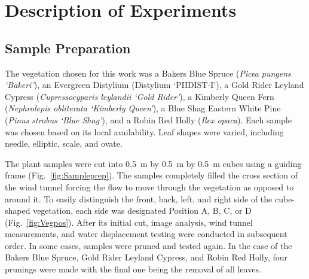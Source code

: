 \documentclass[12pt]{article}
\begin{document}
\section{Description of Experiments}
\label{sec:Experiments}


\subsection{Sample Preparation}
\label{ssec:SamplePrep}

The vegetation chosen for this work was a Bakers Blue Spruce ({\em Picea pungens `Bakeri'}), an Evergreen Distylium (Distylium `PIIDIST-I'), a Gold Rider Leyland Cypress ({\em Cupressocyparis leylandii `Gold Rider'}), a Kimberly Queen Fern ({\em Nephrolepis obliterata `Kimberly Queen'}), a Blue Shag Eastern White Pine ({\em Pinus strobus `Blue Shag'}), and a Robin Red Holly ({\em Ilex opaca}). Each sample was chosen based on its local availability. Leaf shapes were varied, including needle, elliptic, scale, and ovate.

The plant samples were cut into 0.5~\si{m} by 0.5~\si{m} by 0.5~\si{m} cubes using a guiding frame (Fig.~\ref{fig:Sampleprep}). The samples completely filled the cross section of the wind tunnel forcing the flow to move through the vegetation as opposed to around it. To easily distinguish the front, back, left, and right side of the cube-shaped vegetation, each side was designated Position A, B, C, or D (Fig.~\ref{fig:Vegpos}). After its initial cut, image analysis, wind tunnel measurements, and water displacement testing were conducted in subsequent order. In some cases, samples were pruned and tested again. In the case of the Bakers Blue Spruce, Gold Rider Leyland Cypress, and Robin Red Holly, four prunings were made with the final one being the removal of all leaves.
\end{document}

